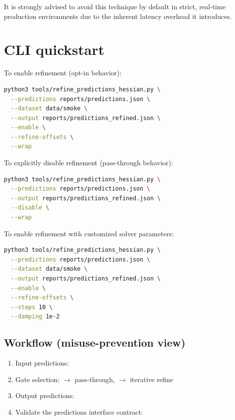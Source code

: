 It is strongly advised to avoid this technique by default in strict, real-time production environments due to the inherent latency overhead it introduces.

\section{CLI quickstart}
To enable refinement (opt-in behavior):
\begin{lstlisting}[language=bash]
python3 tools/refine_predictions_hessian.py \
  --predictions reports/predictions.json \
  --dataset data/smoke \
  --output reports/predictions_refined.json \
  --enable \
  --refine-offsets \
  --wrap
\end{lstlisting}

To explicitly disable refinement (pass-through behavior):
\begin{lstlisting}[language=bash]
python3 tools/refine_predictions_hessian.py \
  --predictions reports/predictions.json \
  --output reports/predictions_refined.json \
  --disable \
  --wrap
\end{lstlisting}

To enable refinement with customized solver parameters:
\begin{lstlisting}[language=bash]
python3 tools/refine_predictions_hessian.py \
  --predictions reports/predictions.json \
  --dataset data/smoke \
  --output reports/predictions_refined.json \
  --enable \
  --refine-offsets \
  --steps 10 \
  --damping 1e-2
\end{lstlisting}

\subsection{Workflow (misuse-prevention view)}
\begin{enumerate}
  \item Input predictions: 
  \item Gate selection:  $\rightarrow$ pass-through,  $\rightarrow$ iterative refine
  \item Output predictions: 
  \item Validate the predictions interface contract: 
\end{enumerate}

